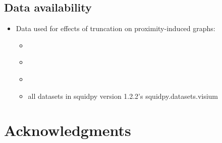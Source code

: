 \documentclass[fleqn,10pt]{olplainarticle}
\begin{document}
\subsection*{Data availability}
\begin{itemize}
    \item Data used for effects of truncation on proximity-induced graphs:
    \begin{itemize}
        \item \cite{keren2018structured}
        \item \cite{mccaffrey2022immunoregulatory}
        \item \cite{piyadasa2026multi}
        \item all datasets in squidpy version 1.2.2's squidpy.datasets.visium

    \end{itemize}
\end{itemize}

\section*{Acknowledgments}


\end{document}
